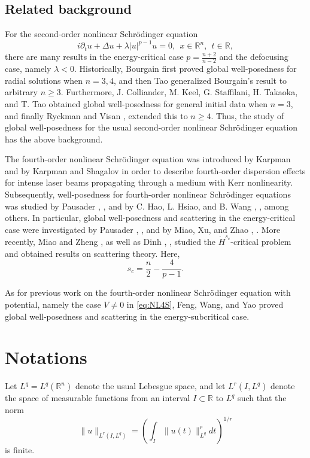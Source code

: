 \documentclass[11pt,a4paper]{article}
\numberwithin{equation}{section}
\begin{document}
\subsection{Related background}
For the second-order nonlinear Schr\"{o}dinger equation
\[
  i\partial_{t}u + \Delta u + \lambda|u|^{p-1}u = 0,\ \ x \in \mathbb{R}^{n}, \ \ t \in \mathbb{R},
\]
there are many results in the energy-critical case $p = \frac{n + 2}{n-2}$ and the defocusing case, namely $\lambda < 0$. Historically, Bourgain \cite{Bourgain} first proved global well-posedness for radial solutions when $n = 3,4$, and then Tao \cite{Tao-2} generalized Bourgain's result to arbitrary $n \geq 3$. Furthermore, J. Colliander, M. Keel, G. Staffilani, H. Takaoka, and T. Tao \cite{Coll} obtained global well-posedness for general initial data when $n = 3$, and finally Ryckman and Visan \cite{Ryckman}, \cite{visan} extended this to $n \geq 4$. Thus, the study of global well-posedness for the usual second-order nonlinear Schr\"{o}dinger equation has the above background.

The fourth-order nonlinear Schr\"{o}dinger equation was introduced by Karpman \cite{Karpman} and by Karpman and Shagalov \cite{Karpman-2} in order to describe fourth-order dispersion effects for intense laser beams propagating through a medium with Kerr nonlinearity. Subsequently, well-posedness for fourth-order nonlinear Schr\"{o}dinger equations was studied by Pausader \cite{Pau}, \cite{Pau-2}, and by C. Hao, L. Hsiao, and B. Wang \cite{Hao-1}, \cite{Hao-2}, among others. In particular, global well-posedness and scattering in the energy-critical case were investigated by Pausader \cite{Pau}, \cite{Pau-3}, and by Miao, Xu, and Zhao \cite{Miao}, \cite{Miao-2}. More recently, Miao and Zheng \cite{Miao-3}, as well as Dinh \cite{Dinh-1}, \cite{Dinh-2}, studied the $\dot{H}^{s_{c}}$-critical problem and obtained results on scattering theory. Here,
\[
 s_{c} = \frac{n}{2} - \frac{4}{p - 1}.
\]

As for previous work on the fourth-order nonlinear Schr\"{o}dinger equation with potential, namely the case $V \neq 0$ in \eqref{eq:NL4S}, Feng, Wang, and Yao \cite{Feng} proved global well-posedness and scattering in the energy-subcritical case.

\section{Notations}
Let $L^{q} = L^{q}(\mathbb{R}^{n})$ denote the usual Lebesgue space, and let $L^{r}(I, L^{q})$ denote the space of measurable functions from an interval $I \subset \mathbb{R}$ to $L^{q}$ such that the norm
\[
 \|u\|_{L^{r}(I, L^{q})} = \left( \int_{I} \|u(t)\|_{L^{q}}^{r}dt \right)^{1/r}
\]
is finite.
\end{document}
